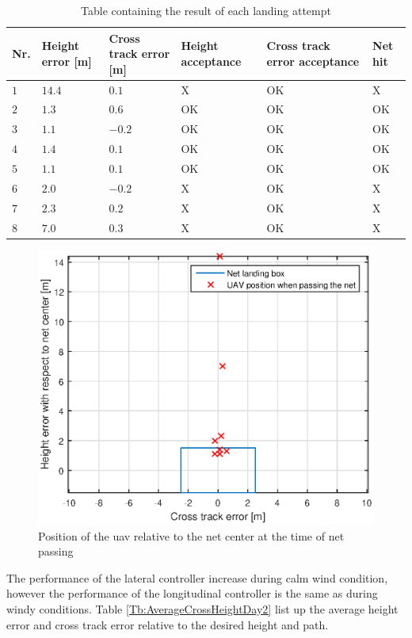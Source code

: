 \begin{table}[H]
\centering
\begin{tabular}{| p{0.5cm} | p{1cm} | p{1cm} | p{3.5cm} | p{3cm} | p{1cm} |}
\hline
\textbf{Nr.}	& \textbf{Height error [m]}	& \textbf{Cross track error [m]}& \textbf{Height acceptance}& \textbf{Cross track error acceptance}	& \textbf{Net hit}\\ \hline
$1$				& $14.4$		& $0.1$		& X								& OK									& X					\\ \hline
$2$				& $1.3$		& $0.6$	& OK								& OK										& OK					\\ \hline
$3$				& $1.1$		& $-0.2$	& OK							& OK									& OK				\\ \hline
$4$				& $1.4$		& $0.1$		& OK							& OK										& OK					\\ \hline
$5$				& $1.1$		& $0.1$		& OK							& OK										& OK					\\ \hline
$6$				& $2.0$		& $-0.2$	& X								& OK									& X					\\ \hline
$7$				& $2.3$		& $0.2$		& X								& OK									& X				\\ \hline
$8$				& $7.0$	& $0.3$	& X										& OK										& X					\\ \hline
\end{tabular}
\caption{Table containing the result of each landing attempt}
\label{tb:Day2LandingAttempt}
\end{table}
\begin{figure}[H]
\centering
\includegraphics[scale=0.7]{figs/Experiment/day2NetHit.eps}
\caption{Position of the \gls{uav} relative to the net center at the time of net passing}
\label{Fig:Day2NetPass}
\end{figure}
The performance of the lateral controller increase during calm wind condition, however the performance of the longitudinal controller is the same as during windy conditions. Table \ref{Tb:AverageCrossHeightDay2} list up the average height error and cross track error relative to the desired height and path. 
